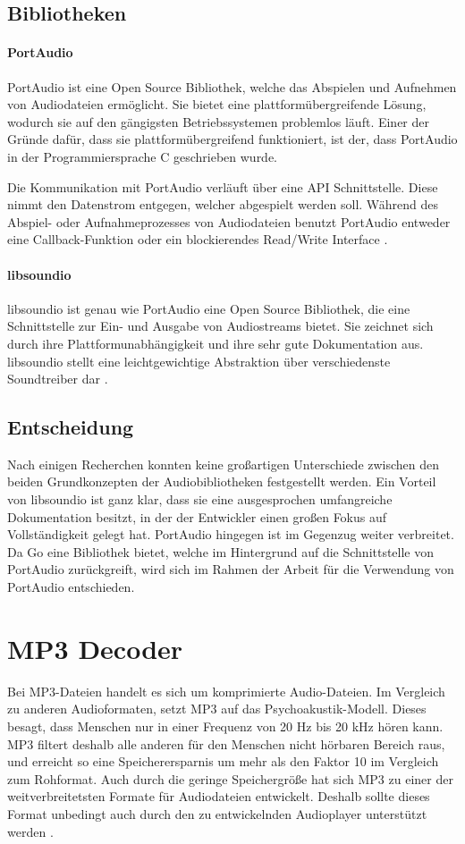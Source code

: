 \subsection{Bibliotheken}
\paragraph{PortAudio}
PortAudio ist eine Open Source Bibliothek, welche das Abspielen und Aufnehmen
von Audiodateien ermöglicht. Sie bietet eine plattformübergreifende Lösung,
wodurch sie auf den gängigsten Betriebssystemen problemlos läuft. Einer der
Gründe dafür, dass sie plattformübergreifend funktioniert, ist der, dass
PortAudio in der Programmiersprache C geschrieben wurde. \hfill

Die Kommunikation mit PortAudio verläuft über eine \ac{API} Schnittstelle.
Diese nimmt den Datenstrom entgegen, welcher abgespielt werden soll. Während
des Abspiel- oder Aufnahmeprozesses von Audiodateien benutzt PortAudio entweder
eine Callback-Funktion oder ein blockierendes Read/Write Interface
\autocite{PortAudio_2019}.

\paragraph{libsoundio}
libsoundio ist genau wie PortAudio eine Open Source Bibliothek, die eine
Schnittstelle zur Ein- und Ausgabe von Audiostreams bietet. Sie zeichnet
sich durch ihre Plattformunabhängigkeit und ihre sehr gute Dokumentation aus.
libsoundio stellt eine leichtgewichtige Abstraktion über verschiedenste
Soundtreiber dar \autocite{libsoundio_2019}.

\subsection{Entscheidung}
Nach einigen Recherchen konnten keine großartigen Unterschiede zwischen den
beiden Grundkonzepten der Audiobibliotheken festgestellt werden. Ein Vorteil von
libsoundio ist ganz klar, dass sie eine ausgesprochen umfangreiche
Dokumentation besitzt, in der der Entwickler einen großen Fokus auf
Vollständigkeit gelegt hat. PortAudio hingegen ist im Gegenzug weiter verbreitet.
Da Go eine Bibliothek bietet, welche im Hintergrund auf die Schnittstelle
von PortAudio zurückgreift, wird sich im Rahmen der Arbeit für die
Verwendung von PortAudio entschieden.

\section{\acs{MP3} Decoder}
Bei \ac{MP3}-Dateien handelt es sich um komprimierte Audio-Dateien. Im
Vergleich zu anderen Audioformaten, setzt \ac{MP3} auf das
Psychoakustik-Modell. Dieses besagt, dass Menschen nur in einer Frequenz von 20
Hz bis 20 kHz hören kann. \ac{MP3} filtert deshalb alle anderen für den
Menschen nicht hörbaren Bereich raus, und erreicht so eine Speicherersparnis um
mehr als den Faktor 10 im Vergleich zum Rohformat. Auch durch die geringe
Speichergröße hat sich \ac{MP3} zu einer der weitverbreitetsten Formate für
Audiodateien entwickelt.  Deshalb sollte dieses Format unbedingt auch durch den
zu entwickelnden Audioplayer unterstützt werden \autocite{mp3}. \hfill

